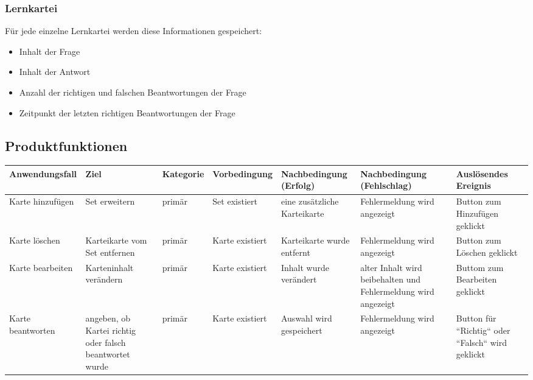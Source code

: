 \subsubsection{Lernkartei}
Für jede einzelne Lernkartei werden diese Informationen gespeichert:
\begin{itemize}
	\item Inhalt der Frage
	\item Inhalt der Antwort
	\item Anzahl der richtigen und falschen Beantwortungen der Frage
	\item Zeitpunkt der letzten richtigen Beantwortungen der Frage
\end{itemize}


\begin{landscape}
\begin{center}
\subsection{Produktfunktionen}


\begin{tabulary}{1.35\textwidth}{|L|L|L|L|L|L|L|}
\hline 
\textbf{Anwendungsfall} & \textbf{Ziel} & \textbf{Kategorie} & \textbf{Vorbedingung} & \textbf{Nachbedingung (Erfolg)} & \textbf{Nachbedingung (Fehlschlag)} & \textbf{Auslösendes Ereignis} \\ 
\hline 
Karte hinzufügen & Set erweitern & primär & Set existiert & eine zusätzliche Karteikarte & Fehlermeldung wird angezeigt & Button zum Hinzufügen geklickt \\ 
\hline 
Karte löschen & Karteikarte vom Set entfernen & primär & Karte existiert & Karteikarte wurde entfernt & Fehlermeldung wird angezeigt & Button zum Löschen geklickt \\ 
\hline 
Karte bearbeiten & Karteninhalt verändern & primär & Karte existiert & Inhalt wurde verändert & alter Inhalt wird beibehalten und Fehlermeldung wird angezeigt & Buttom zum Bearbeiten geklickt \\ 
\hline 
Karte beantworten & angeben, ob Kartei richtig oder falsch beantwortet wurde & primär & Karte existiert & Auswahl wird gespeichert & Fehlermeldung wird angezeigt & Button für ``Richtig`` oder ``Falsch`` wird geklickt \\ 
\hline 
\end{tabulary} 
\end{center}
\end{landscape}
\restoregeometry

